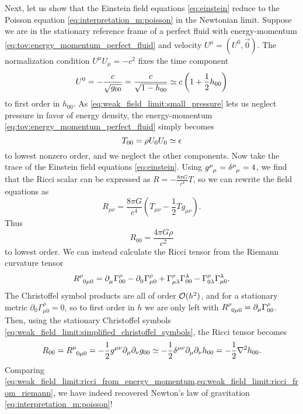 Next, let us show that the Einstein field equations \eqref{eq:einstein} reduce to the Poisson equation \eqref{eq:interpretation_m:poisson} in the Newtonian limit.
Suppose we are in the stationary reference frame of a perfect fluid with energy-momentum \eqref{eq:tov:energy_momentum_perfect_fluid} and velocity $U^\mu = (U^0, \vec{0})$.
The normalization condition $U^\mu U_\mu = -c^2$ fixes the time component
\begin{equation}
	U^0 = - \frac{c}{\sqrt{g_{00}}} = \frac{c}{\sqrt{1-h_{00}}} \simeq c \left( 1 + \frac12 h_{00} \right)
\end{equation}
to first order in $h_{00}$.
As \cref{eq:weak_field_limit:small_pressure} lets us neglect pressure in favor of energy density, the energy-momentum \eqref{eq:tov:energy_momentum_perfect_fluid} simply becomes
\begin{equation}
	T_{00} = \rho U_0 U_0 \simeq \epsilon
\end{equation}
to lowest nonzero order, and we neglect the other components.
Now take the trace of the Einstein field equations \eqref{eq:einstein}.
Using $g\indices{^\mu_\mu} = \delta\indices{^\mu_\mu} = 4$, we find that the Ricci scalar can be expressed as $R = - \frac{8 \pi G}{c^4} T$, so we can rewrite the field equations as
\begin{equation}
	R_{\mu \nu} = \frac{8 \pi G}{c^4} \left( T_{\mu \nu} - \frac12 T g_{\mu \nu} \right) .
	\label{eq:einstein_rewritten}
\end{equation}
Thus
\begin{equation}
	R_{00} = \frac{4 \pi G \rho}{c^2}
	\label{eq:weak_field_limit:ricci_from_energy_momentum}
\end{equation}
to lowest order.
We can instead calculate the Ricci tensor from the Riemann curvature tensor
\begin{equation}
	R\indices{^\rho_0_\mu_0} =
	\partial\indices{_\mu} \Gamma^\rho_{0 0} -
	\partial\indices{_0} \Gamma^{\rho}_{\mu 0} +
	\Gamma^\rho_{\mu \lambda} \Gamma^{\lambda}_{0 0} -
	\Gamma^\rho_{0 \lambda} \Gamma^{\lambda}_{\mu 0} .
\end{equation}
The Christoffel symbol products are all of order $\mathcal{O}(h^2)$, and for a stationary metric $\partial_0 \Gamma^\rho_{\mu 0} = 0$, so to first order in $h$ we are only left with $R\indices{^\rho_0_\mu_0} = \partial_\mu \Gamma^\rho_{00}$.
Then, using the stationary Christoffel symbols \eqref{eq:weak_field_limit:simplified_christoffel_symbols}, the Ricci tensor becomes
\begin{equation}
	R_{00} =       R\indices{^\mu_{0 \mu 0}}
		   =       -\frac12 g^{\mu \nu} \partial_\mu \partial_\nu g_{00}
		   \taylor -\frac12 \delta^{\mu \nu} \partial_\mu \partial_\nu h_{00}
		   =       -\frac12 \nabla^2 h_{00} .
	\label{eq:weak_field_limit:ricci_from_riemann}
\end{equation}
Comparing \cref{eq:weak_field_limit:ricci_from_energy_momentum,eq:weak_field_limit:ricci_from_riemann}, we have indeed recovered Newton's law of gravitation \eqref{eq:interpretation_m:poisson}!

